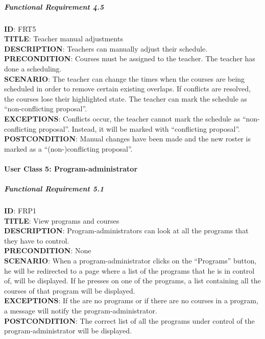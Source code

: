 \documentclass[9pt]{article}
\begin{document}
\subparagraph{Functional Requirement
4.5}\label{functional-requirement-4.5}

\textbf{ID}: FRT5\\\textbf{TITLE}: Teacher manual
adjustments\\\textbf{DESCRIPTION}: Teachers can manually adjust their
schedule.\\\textbf{PRECONDITION}: Courses must be assigned to the
teacher. The teacher has done a scheduling.\\\textbf{SCENARIO}: The
teacher can change the times when the courses are being scheduled in
order to remove certain existing overlaps. If conflicts are resolved,
the courses lose their highlighted state. The teacher can mark the
schedule as ``non-conflicting proposal''.\\\textbf{EXCEPTIONS}:
Conflicts occur, the teacher cannot mark the schedule as
``non-conflicting proposal''. Instead, it will be marked with
``conflicting proposal''.\\\textbf{POSTCONDITION}: Manual changes have
been made and the new roster is marked as a ``(non-)conflicting
proposal''.

\paragraph{User Class 5:
Program-administrator}\label{user-class-5-program-administrator}

\subparagraph{Functional Requirement
5.1}\label{functional-requirement-5.1}

\textbf{ID}: FRP1\\\textbf{TITLE}: View programs and
courses\\\textbf{DESCRIPTION}: Program-administrators can look at all
the programs that they have to control.\\\textbf{PRECONDITION}:
None\\\textbf{SCENARIO}: When a program-administrator clicks on the
``Programs'' button, he will be redirected to a page where a list of the
programs that he is in control of, will be displayed. If he presses on
one of the programs, a list containing all the courses of that program
will be displayed.\\\textbf{EXCEPTIONS}: If the are no programs or if
there are no courses in a program, a message will notify the
program-administrator.\\\textbf{POSTCONDITION}: The correct list of all
the programs under control of the program-administrator will be
displayed.
\end{document}
